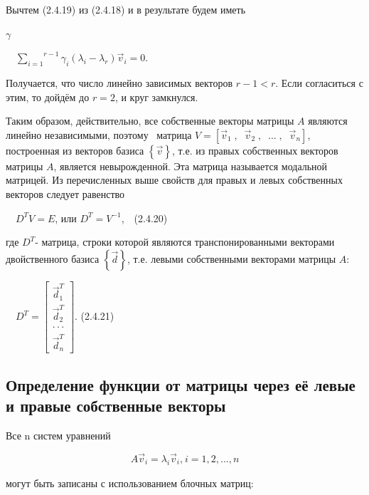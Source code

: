 		Вычтем (2.4.19) из (2.4.18) и в результате будем иметь

$ \gamma $

		\ \  $\overset{r-1}{\underset{i=1}{\sum }}\gamma_i(\lambda _i-\lambda _r)\vec v_i=0$.



		Получается, что число линейно зависимых векторов  $r-1<r$. Если согласиться с этим, то дойдём до  $r=2$, и круг
		замкнулся.



		Таким образом, действительно, все собственные векторы матрицы  $A$ являются линейно независимыми, поэтому \ матрица 
		$V=\left[\vec v_1\;,\;\;\vec v_2\;,\;\;...\;,\;\;\vec v_n\right]$, построенная из векторов базиса  $\left\{\vec
		v\right\}$, т.е. из правых собственных векторов матрицы $A$, является невырожденной. Эта матрица называется модальной
		матрицей. Из перечисленных выше свойств для правых и левых собственных векторов следует равенство



		\ \  $D^TV=E$, или  $D^T=V^{-1}$,\ \ (2.4.20)



		где  $D^T$- матрица, строки которой являются транспонированными векторами двойственного базиса  $\left\{\vec d\right\}$,
		т.е. левыми собственными векторами матрицы  $A$:



		\ \  $D^T=\left[\begin{matrix}\vec d_1^T\\\vec d_2^T\\\cdot \cdot \cdot \\\vec
		d_n^T\end{matrix}\right]$.  (2.4.21)



\bigskip

\subsection{Определение функции от матрицы через её левые и правые собственные векторы}

\bigskip


		Все n систем уравнений


\begin{equation*}
A\vec v_i=\lambda _i\vec v_i,_{}^{}i=1,2,...,n
\end{equation*}

		могут быть записаны с использованием блочных матриц:



